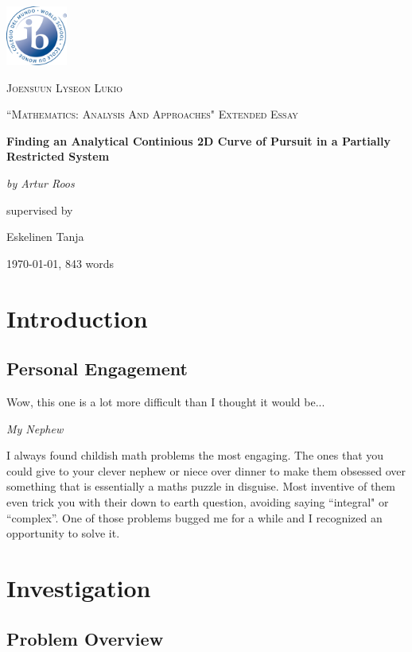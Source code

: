 \documentclass[12pt]{article}
\begin{document}
\begin{titlepage}
	\centering
	\includegraphics[width=0.15\textwidth]{dp-programme-logo}\par\vspace{1cm}
	{\textsc{Joensuun Lyseon Lukio} \par}
	\vspace{1cm}
	{\Large \textsc{``Mathematics: Analysis And Approaches" Extended Essay}\par}
	\vspace{1.5cm}
	{\huge\bfseries Finding an Analytical Continious 2D Curve of Pursuit in a Partially Restricted System\par}
	\vspace{2cm}
	{\Large\itshape by Artur Roos\par}
	\vfill
	supervised by\par
	Eskelinen Tanja
	\vfill
	{\large \today, 843 words\par}
\end{titlepage}

\clearpage
{}
\tableofcontents
\vspace{48pt}

\section{Introduction}
\subsection{Personal Engagement}
\epigraph{Wow, this one is a lot more difficult than I thought it would be...}{\textit{My Nephew}}
I always found childish math problems the most engaging. The ones that you could give to your clever nephew or niece over dinner to make them obsessed over something that is essentially a maths puzzle in disguise. Most inventive of them even trick you with their down to earth question, avoiding saying ``integral" or ``complex''. One of those problems bugged me for a while and I recognized an opportunity to solve it.

\section{Investigation}
\subsection{Problem Overview}
\end{document}
